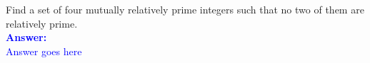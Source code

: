 \item{}
Find a set of four mutually relatively prime integers such that no two of them
are relatively prime.
\\[12pt]
\ifanswers
\textcolor{blue}{
\textbf{Answer:}\\[6pt]
Answer goes here
}
\newpage
\fi
